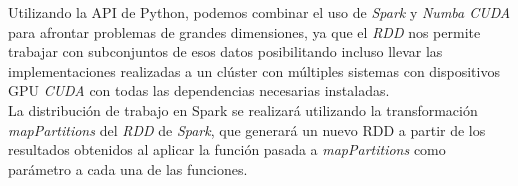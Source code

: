 Utilizando la API de Python, podemos combinar el uso de \textit{Spark} y \textit{Numba CUDA} para afrontar problemas de grandes dimensiones, ya que el \textit{RDD} nos permite trabajar con subconjuntos de esos datos posibilitando incluso llevar las implementaciones realizadas a un clúster con múltiples sistemas con dispositivos GPU \textit{CUDA} con todas las dependencias necesarias instaladas. \\

La distribución de trabajo en Spark se realizará utilizando la transformación \textit{mapPartitions} del \textit{RDD} de \textit{Spark}, que generará un nuevo RDD a partir de los resultados obtenidos al aplicar la función pasada a \textit{mapPartitions} como parámetro a cada una de las funciones.

